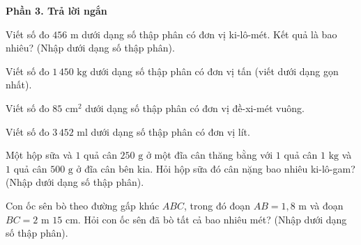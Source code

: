 \textbf{Phần 3. Trả lời ngắn}

\begin{ex} %
Viết số đo $456\text{ m}$ dưới dạng số thập phân có đơn vị ki-lô-mét. Kết quả là bao nhiêu? (Nhập dưới dạng số thập phân).
\end{ex}

\begin{ex} %
Viết số đo $1\,450\text{ kg}$ dưới dạng số thập phân có đơn vị tấn (viết dưới dạng gọn nhất).
\end{ex}

\begin{ex} %
Viết số đo $85\text{ cm}^2$ dưới dạng số thập phân có đơn vị đề-xi-mét vuông.
\end{ex}

\begin{ex} %
Viết số đo $3\,452\text{ ml}$ dưới dạng số thập phân có đơn vị lít.
\end{ex}

\begin{ex} %
Một hộp sữa và $1$ quả cân $250\text{ g}$ ở một đĩa cân thăng bằng với $1$ quả cân $1\text{ kg}$ và $1$ quả cân $500\text{ g}$ ở đĩa cân bên kia. Hỏi hộp sữa đó cân nặng bao nhiêu ki-lô-gam? (Nhập dưới dạng số thập phân).
\end{ex}

\begin{ex} %
Con ốc sên bò theo đường gấp khúc $ABC$, trong đó đoạn $AB = 1{,}8\text{ m}$ và đoạn $BC = 2\text{ m } 15\text{ cm}$. Hỏi con ốc sên đã bò tất cả bao nhiêu mét? (Nhập dưới dạng số thập phân).
\end{ex}
